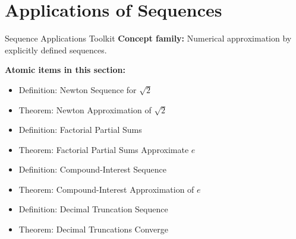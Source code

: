 \section{Applications of Sequences}

\begin{toolkitbox}{Sequence Applications Toolkit}
\textbf{Concept family:} Numerical approximation by explicitly defined
sequences.

\medskip
\textbf{Atomic items in this section:}
\begin{itemize}
  \item Definition: Newton Sequence for $\sqrt{2}$
  \item Theorem: Newton Approximation of $\sqrt{2}$
  \item Definition: Factorial Partial Sums
  \item Theorem: Factorial Partial Sums Approximate $e$
  \item Definition: Compound-Interest Sequence
  \item Theorem: Compound-Interest Approximation of $e$
  \item Definition: Decimal Truncation Sequence
  \item Theorem: Decimal Truncations Converge
\end{itemize}
\end{toolkitbox}


